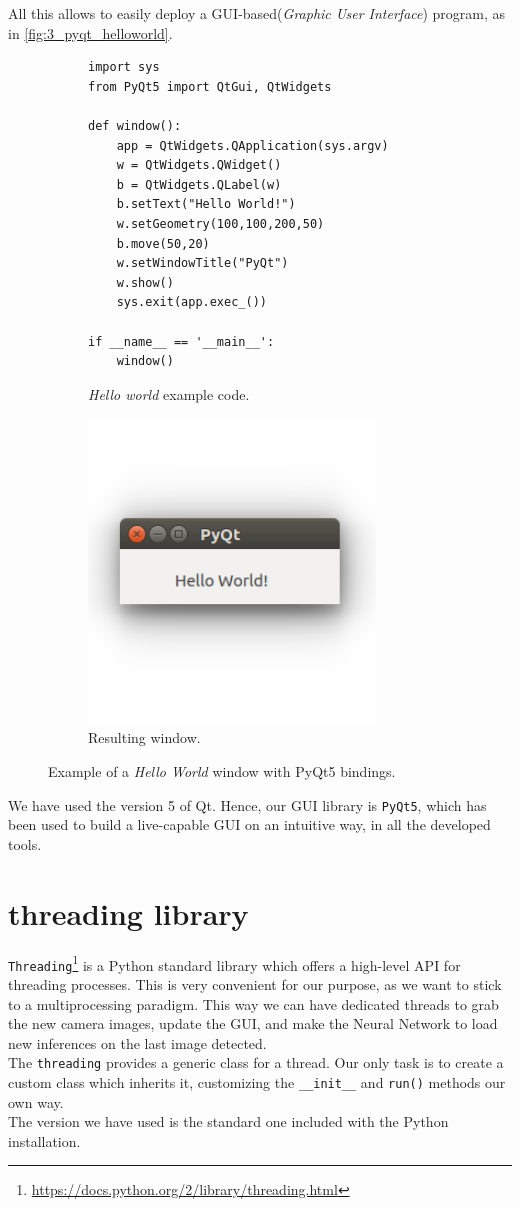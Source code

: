 	All this allows to easily deploy a GUI-based(\emph{Graphic User Interface}) program, as in \autoref{fig:3_pyqt_helloworld}.
	\begin{figure}[h]
		\centering
		\begin{subfigure}[h]{0.55\linewidth}
			\centering
			\begin{lstlisting}
import sys
from PyQt5 import QtGui, QtWidgets

def window():
	app = QtWidgets.QApplication(sys.argv)
	w = QtWidgets.QWidget()
	b = QtWidgets.QLabel(w)
	b.setText("Hello World!")
	w.setGeometry(100,100,200,50)
	b.move(50,20)
	w.setWindowTitle("PyQt")
	w.show()
	sys.exit(app.exec_())

if __name__ == '__main__':
	window()
			\end{lstlisting}
			\caption{\emph{Hello world} example code.}
		\end{subfigure}
		\qquad
		\begin{subfigure}[h]{0.35\linewidth}
			\centering
			\includegraphics[width=3in]{images/pyqt_helloworld}
			\caption{Resulting window.}
		\end{subfigure}
		\caption{Example of a \emph{Hello World} window with PyQt5 bindings.}
		\label{fig:3_pyqt_helloworld}
	\end{figure}
	
	We have used the version 5 of Qt. Hence, our GUI library is \texttt{PyQt5}, which has been used to build a live-capable GUI on an intuitive way, in all the developed tools.\\
	
\section{threading library}
	\label{sec:3_threading}
	\texttt{Threading}\footnote{\url{https://docs.python.org/2/library/threading.html}} is a Python standard library which offers a high-level API for threading processes. This is very convenient for our purpose, as we want to stick to a multiprocessing paradigm. This way we can have dedicated threads to grab the new camera images, update the GUI, and make the Neural Network to load new inferences on the last image detected.\\
	
	The \texttt{threading} provides a generic class for a thread. Our only task is to create a custom class which inherits it, customizing the \texttt{\_\_init\_\_} and \texttt{run()} methods our own way.\\

The version we have used is the standard one included with the Python installation.
